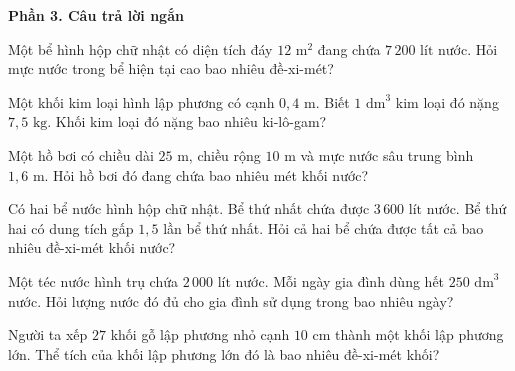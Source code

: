 \textbf{Phần 3. Câu trả lời ngắn}

\begin{ex} %
Một bể hình hộp chữ nhật có diện tích đáy $12\text{ m}^2$ đang chứa $7\,200\text{ lít}$ nước. Hỏi mực nước trong bể hiện tại cao bao nhiêu đề-xi-mét?
\end{ex}

\begin{ex} %
Một khối kim loại hình lập phương có cạnh $0{,}4\text{ m}$. Biết $1\text{ dm}^3$ kim loại đó nặng $7{,}5\text{ kg}$. Khối kim loại đó nặng bao nhiêu ki-lô-gam?
\end{ex}

\begin{ex} %
Một hồ bơi có chiều dài $25\text{ m}$, chiều rộng $10\text{ m}$ và mực nước sâu trung bình $1{,}6\text{ m}$. Hỏi hồ bơi đó đang chứa bao nhiêu mét khối nước?
\end{ex}

\begin{ex} %
Có hai bể nước hình hộp chữ nhật. Bể thứ nhất chứa được $3\,600\text{ lít}$ nước. Bể thứ hai có dung tích gấp $1{,}5$ lần bể thứ nhất. Hỏi cả hai bể chứa được tất cả bao nhiêu đề-xi-mét khối nước?
\end{ex}

\begin{ex} %
Một téc nước hình trụ chứa $2\,000\text{ lít}$ nước. Mỗi ngày gia đình dùng hết $250\text{ dm}^3$ nước. Hỏi lượng nước đó đủ cho gia đình sử dụng trong bao nhiêu ngày?
\end{ex}

\begin{ex} %
Người ta xếp $27$ khối gỗ lập phương nhỏ cạnh $10\text{ cm}$ thành một khối lập phương lớn. Thể tích của khối lập phương lớn đó là bao nhiêu đề-xi-mét khối?
\end{ex}
